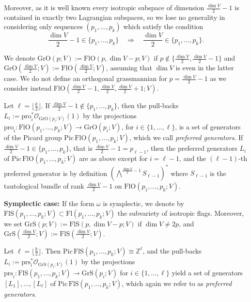 \documentclass[12pt]{amsart}
\newcommand{\Flags}{\mathrm{Fl}}
\newcommand{\OFlags}{\mathrm{FlO}}
\newcommand{\OGrass}{\mathrm{GrO}}
\newcommand{\SFlags}{\mathrm{FlS}}
\newcommand{\SGrass}{\mathrm{GrS}}
\newcommand{\Pic}{\mathrm{Pic}}
\theoremstyle{definition}
\begin{document}
Moreover, as it is well known every isotropic subspace of dimension $\frac{\dim V}{2}-1$ is contained in exactly two Lagrangian subspaces, so we lose no generality in considering only sequences $(p_1,\ldots,p_k)$ which satisfy the  condition
$$
\frac{\dim V}{2}-1\in\{p_1,\ldots,p_k\}\quad\Rightarrow\quad \frac{\dim V}{2}\in\{p_1,\ldots,p_k\}.
$$

  


We denote $\OGrass(p;V):=\OFlags(p,\dim V-p;V)$ if $p\notin\{\frac{\dim V}{2},\frac{\dim V}{2}-1\}$
and $\OGrass(\frac{\dim V}{2};V):=\OFlags(\frac{\dim V}{2};V)$, assuming that $\dim V$ is even in the latter case.
We do not define an orthogonal grassmannian for $p=\frac{\dim V}{2}-1$ as we consider instead $\OFlags(\frac{\dim V}{2}-1,\frac{\dim V}{2},\frac{\dim V}{2}+1;V)$.


Let $\ell=\lfloor\frac{k}{2}\rfloor$. 
If $\frac{\dim V}{2}-1\notin\{p_1,\ldots,p_k\}$, then the pull-backs $L_i:=\mathrm{pro}_i^*\mathcal{O}_{\OGrass(p_i;V)}(1)$
by the projections $\mathrm{pro}_i:\OFlags(p_1,\ldots,p_k;V)\to\OGrass(p_i;V)$, for $i\in\{1,\ldots,\ell\}$, is a set of generators of the Picard group $\Pic\,\OFlags(p_1,\ldots,p_k;V)$, which we call \emph{preferred generators}.
If $\frac{\dim V}{2}-1\in\{p_1,\ldots,p_k\}$, that is $\frac{\dim V}{2}-1=p_{\ell-1}$, then the preferred generators $L_i$ of $\Pic\,\OFlags(p_1,\ldots,p_k;V)$ are  as above except for $i=\ell-1$, and the $(\ell-1)$-th preferred generator is by definition
$(\bigwedge^{\frac{\dim V}{2}-1}S_{\ell-1})^*$ where $S_{\ell-1}$ is the tautological bundle of rank $\frac{\dim V}{2}-1$ on $\OFlags(p_1,\ldots,p_k;V)$.

\bigskip

{\bf Symplectic case:} 
If the form $\omega$ is symplectic, we denote by $\SFlags(p_1,\ldots,p_k;V)\subset\Flags(p_1,\ldots,p_k;V)$ the subvariety of isotropic flags. Moreover, we set $\SGrass(p;V):=\SFlags(p,\dim V-p;V)$ if $\dim V\not=2p$, and $\SGrass(\frac{\dim V}{2};V):=\SFlags(\frac{\dim V}{2};V)$.

Let $\ell=\lfloor\frac{k}{2}\rfloor$. Then
$\Pic\,\SFlags(p_1,\ldots,p_k;V)\cong\mathbb{Z}^\ell$, and the pull-backs $L_i:=\mathrm{prs}_i^*\mathcal{O}_{\SGrass(p_i;V)}(1)$ by the projections $\mathrm{prs}_i:\SFlags(p_1,\ldots,p_k;V)\to\SGrass(p_i;V)$ for $i\in\{1,\ldots,\ell\}$
yield a set of generators $[L_1],\ldots,[L_{\ell}]$ of $\Pic\,\SFlags(p_1,\ldots,p_k;V)$, which again we refer to as \emph{preferred generators}.
\end{document}
